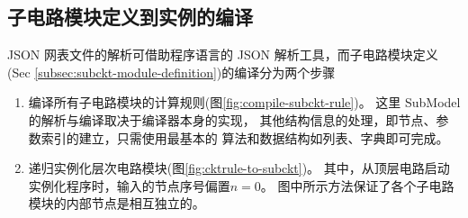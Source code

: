 \subsection{子电路模块定义到实例的编译}
\label{subsec:subckt-module-compilation}
JSON 网表文件的解析可借助程序语言的 JSON 解析工具，而子电路模块定义
(Sec \ref{subsec:subckt-module-definition})的编译分为两个步骤
\begin{enumerate}[partopsep=0pt,topsep=0pt,itemsep=0pt,parsep=0pt]
  \item 编译所有子电路模块的计算规则(图\ref{fig:compile-subckt-rule})。
    这里 SubModel 的解析与编译取决于编译器本身的实现，
    其他结构信息的处理，即节点、参数索引的建立，只需使用最基本的
    算法和数据结构如列表、字典即可完成。
  \item 递归实例化层次电路模块(图\ref{fig:cktrule-to-subckt})。
    其中，从顶层电路启动实例化程序时，输入的节点序号偏置$n=0$。
    图中所示方法保证了各个子电路模块的内部节点是相互独立的。
\end{enumerate}
